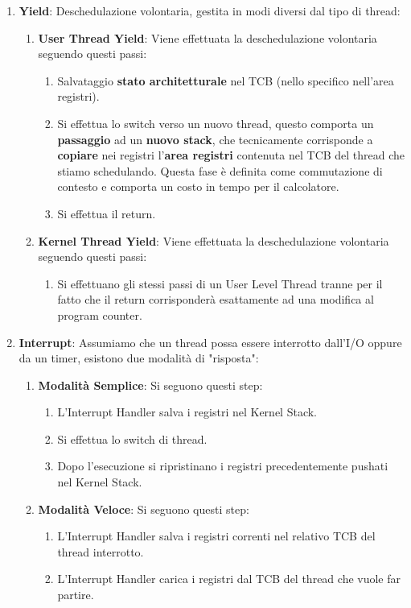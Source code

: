 \documentclass{article}
\begin{document}
\begin{enumerate}
    \item \textbf{Yield}: Deschedulazione volontaria, gestita in modi diversi dal tipo di thread:
    \begin{enumerate}
        \item \textbf{User Thread Yield}: Viene effettuata la deschedulazione volontaria seguendo questi passi:
        \begin{enumerate}
            \item Salvataggio \textbf{stato architetturale} nel TCB (nello specifico nell'area registri).
            \item Si effettua lo switch verso un nuovo thread, questo comporta un \textbf{passaggio} ad un \textbf{nuovo stack}, che tecnicamente
            corrisponde a \textbf{copiare} nei registri l'\textbf{area registri} contenuta nel TCB del thread che stiamo schedulando. Questa fase
            è definita come commutazione di contesto e comporta un costo in tempo per il calcolatore.
            \item Si effettua il return.
        \end{enumerate}
        \item \textbf{Kernel Thread Yield}: Viene effettuata la deschedulazione volontaria seguendo questi passi:
        \begin{enumerate}
            \item Si effettuano gli stessi passi di un User Level Thread tranne per il fatto che il return corrisponderà esattamente
            ad una modifica al program counter.
        \end{enumerate}
    \end{enumerate}
    \item \textbf{Interrupt}: Assumiamo che un thread possa essere interrotto dall'I/O oppure da un timer, esistono due modalità di "risposta":
    \begin{enumerate}
        \item \textbf{Modalità Semplice}: Si seguono questi step:
        \begin{enumerate}
            \item L'Interrupt Handler salva i registri nel Kernel Stack.
            \item Si effettua lo switch di thread.
            \item Dopo l'esecuzione si ripristinano i registri precedentemente pushati nel Kernel Stack.
        \end{enumerate}
        \item \textbf{Modalità Veloce}: Si seguono questi step:
        \begin{enumerate}
            \item L'Interrupt Handler salva i registri correnti nel relativo TCB del thread interrotto.
            \item L'Interrupt Handler carica i registri dal TCB del thread che vuole far partire.
        \end{enumerate}
    \end{enumerate}
\end{enumerate}
\end{document}
